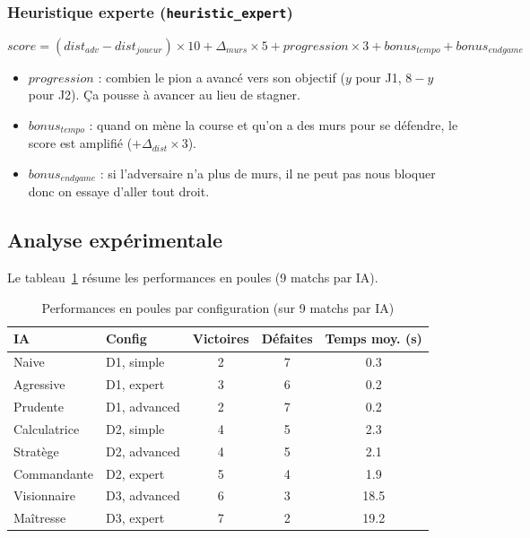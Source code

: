 \documentclass[a4paper, 12pt]{report}
\begin{document}
\subsubsection{Heuristique experte (\texttt{heuristic\_expert})}

\begin{equation}
    score = (dist_{adv} - dist_{joueur}) \times 10 + \Delta_{murs} \times 5 + progression \times 3 + bonus_{tempo} + bonus_{endgame}
\end{equation}

\begin{itemize}
    \item $progression$ : combien le pion a avancé vers son objectif ($y$ pour J1, $8-y$ pour J2). Ça pousse à avancer au lieu de stagner.
    \item $bonus_{tempo}$ : quand on mène la course et qu'on a des murs pour se défendre, le score est amplifié ($+\Delta_{dist} \times 3$).
    \item $bonus_{endgame}$ : si l'adversaire n'a plus de murs, il ne peut pas nous bloquer donc on essaye d'aller tout droit.
\end{itemize}

\subsection{Analyse expérimentale}

Le tableau~\ref{tab:perf} résume les performances en poules (9 matchs par IA).

\begin{table}[H]
\centering
\caption{Performances en poules par configuration (sur 9 matchs par IA)}
\label{tab:perf}
\begin{tabular}{llccc}
\toprule
\textbf{IA} & \textbf{Config} & \textbf{Victoires} & \textbf{Défaites} & \textbf{Temps moy. (s)} \\
\midrule
Naive & D1, simple & 2 & 7 & 0.3 \\
Agressive & D1, expert & 3 & 6 & 0.2 \\
Prudente & D1, advanced & 2 & 7 & 0.2 \\
Calculatrice & D2, simple & 4 & 5 & 2.3 \\
Stratège & D2, advanced & 4 & 5 & 2.1 \\
Commandante & D2, expert & 5 & 4 & 1.9 \\
Visionnaire & D3, advanced & 6 & 3 & 18.5 \\
Maîtresse & D3, expert & 7 & 2 & 19.2 \\
\bottomrule
\end{tabular}
\end{table}
\end{document}
